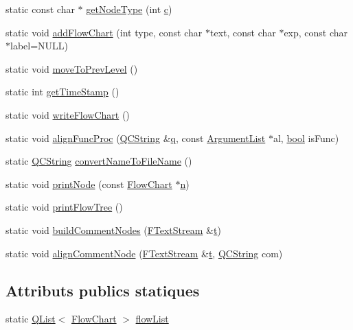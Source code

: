 \begin{DoxyCompactItemize}
\item 
static const char $\ast$ \hyperlink{class_flow_chart_a45109b9f0963e9c0b92a467e0ce63f12}{get\+Node\+Type} (int \hyperlink{060__command__switch_8tcl_ab14f56bc3bd7680490ece4ad7815465f}{c})
\item 
static void \hyperlink{class_flow_chart_a088b9279872e7aa873e48b716df00542}{add\+Flow\+Chart} (int type, const char $\ast$text, const char $\ast$exp, const char $\ast$label=N\+U\+L\+L)
\item 
static void \hyperlink{class_flow_chart_a9ddf7f6aff23849c4bbb90afbabd38c1}{move\+To\+Prev\+Level} ()
\item 
static int \hyperlink{class_flow_chart_a50ac682c2637e445a71ef5154f75747d}{get\+Time\+Stamp} ()
\item 
static void \hyperlink{class_flow_chart_a66989e6892ad6bbb539241dedbfc4f9e}{write\+Flow\+Chart} ()
\item 
static void \hyperlink{class_flow_chart_a3feb50e4c544d756e6b0b3edab073f41}{align\+Func\+Proc} (\hyperlink{class_q_c_string}{Q\+C\+String} \&\hyperlink{060__command__switch_8tcl_ab678a0a9a7e94bce5b17141f40220d88}{q}, const \hyperlink{class_argument_list}{Argument\+List} $\ast$al, \hyperlink{qglobal_8h_a1062901a7428fdd9c7f180f5e01ea056}{bool} is\+Func)
\item 
static \hyperlink{class_q_c_string}{Q\+C\+String} \hyperlink{class_flow_chart_aaadfeca7904b4d69db2cda56d753d7a6}{convert\+Name\+To\+File\+Name} ()
\item 
static void \hyperlink{class_flow_chart_a780c7678733b86fa3f47fb48b9d3bdc2}{print\+Node} (const \hyperlink{class_flow_chart}{Flow\+Chart} $\ast$\hyperlink{060__command__switch_8tcl_acdde3cd86eb2421ce8dbb2e85227d368}{n})
\item 
static void \hyperlink{class_flow_chart_a25647e6b336425f3f5ccef2ecea0dcf1}{print\+Flow\+Tree} ()
\item 
static void \hyperlink{class_flow_chart_ac9946d79e1bc63fe91324fe22c0d2fc1}{build\+Comment\+Nodes} (\hyperlink{class_f_text_stream}{F\+Text\+Stream} \&\hyperlink{058__bracket__recursion_8tcl_a69e959f6901827e4d8271aeaa5fba0fc}{t})
\item 
static void \hyperlink{class_flow_chart_a3a4b52a7183d50862628df4ecd70bf60}{align\+Comment\+Node} (\hyperlink{class_f_text_stream}{F\+Text\+Stream} \&\hyperlink{058__bracket__recursion_8tcl_a69e959f6901827e4d8271aeaa5fba0fc}{t}, \hyperlink{class_q_c_string}{Q\+C\+String} com)
\end{DoxyCompactItemize}
\subsection*{Attributs publics statiques}
\begin{DoxyCompactItemize}
\item 
static \hyperlink{class_q_list}{Q\+List}$<$ \hyperlink{class_flow_chart}{Flow\+Chart} $>$ \hyperlink{class_flow_chart_a9acef436683828debe7218c734e22697}{flow\+List}
\end{DoxyCompactItemize}


